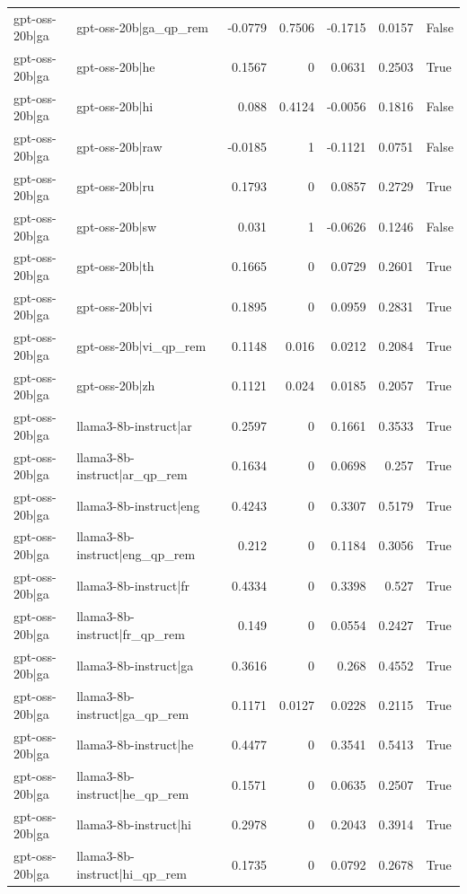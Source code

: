 \begin{table}
\begin{tabular}{l l r r r r l}
gpt-oss-20b|ga & gpt-oss-20b|ga_qp_rem & -0.0779 & 0.7506 & -0.1715 & 0.0157 & False \\
gpt-oss-20b|ga & gpt-oss-20b|he & 0.1567 & 0 & 0.0631 & 0.2503 & True \\
gpt-oss-20b|ga & gpt-oss-20b|hi & 0.088 & 0.4124 & -0.0056 & 0.1816 & False \\
gpt-oss-20b|ga & gpt-oss-20b|raw & -0.0185 & 1 & -0.1121 & 0.0751 & False \\
gpt-oss-20b|ga & gpt-oss-20b|ru & 0.1793 & 0 & 0.0857 & 0.2729 & True \\
gpt-oss-20b|ga & gpt-oss-20b|sw & 0.031 & 1 & -0.0626 & 0.1246 & False \\
gpt-oss-20b|ga & gpt-oss-20b|th & 0.1665 & 0 & 0.0729 & 0.2601 & True \\
gpt-oss-20b|ga & gpt-oss-20b|vi & 0.1895 & 0 & 0.0959 & 0.2831 & True \\
gpt-oss-20b|ga & gpt-oss-20b|vi_qp_rem & 0.1148 & 0.016 & 0.0212 & 0.2084 & True \\
gpt-oss-20b|ga & gpt-oss-20b|zh & 0.1121 & 0.024 & 0.0185 & 0.2057 & True \\
gpt-oss-20b|ga & llama3-8b-instruct|ar & 0.2597 & 0 & 0.1661 & 0.3533 & True \\
gpt-oss-20b|ga & llama3-8b-instruct|ar_qp_rem & 0.1634 & 0 & 0.0698 & 0.257 & True \\
gpt-oss-20b|ga & llama3-8b-instruct|eng & 0.4243 & 0 & 0.3307 & 0.5179 & True \\
gpt-oss-20b|ga & llama3-8b-instruct|eng_qp_rem & 0.212 & 0 & 0.1184 & 0.3056 & True \\
gpt-oss-20b|ga & llama3-8b-instruct|fr & 0.4334 & 0 & 0.3398 & 0.527 & True \\
gpt-oss-20b|ga & llama3-8b-instruct|fr_qp_rem & 0.149 & 0 & 0.0554 & 0.2427 & True \\
gpt-oss-20b|ga & llama3-8b-instruct|ga & 0.3616 & 0 & 0.268 & 0.4552 & True \\
gpt-oss-20b|ga & llama3-8b-instruct|ga_qp_rem & 0.1171 & 0.0127 & 0.0228 & 0.2115 & True \\
gpt-oss-20b|ga & llama3-8b-instruct|he & 0.4477 & 0 & 0.3541 & 0.5413 & True \\
gpt-oss-20b|ga & llama3-8b-instruct|he_qp_rem & 0.1571 & 0 & 0.0635 & 0.2507 & True \\
gpt-oss-20b|ga & llama3-8b-instruct|hi & 0.2978 & 0 & 0.2043 & 0.3914 & True \\
gpt-oss-20b|ga & llama3-8b-instruct|hi_qp_rem & 0.1735 & 0 & 0.0792 & 0.2678 & True \\

\end{tabular}
\end{table}
